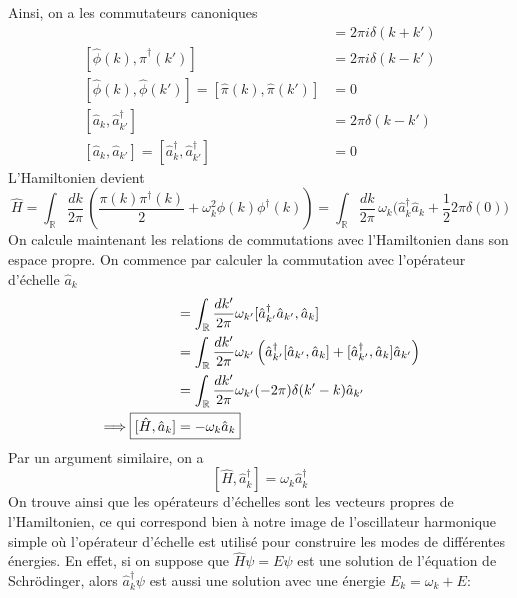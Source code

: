 \documentclass{article}
\numberwithin{equation}{section}
\theoremstyle{solution}
\begin{document}
Ainsi, on a les commutateurs canoniques
\begin{align}
        [\hat{\phi}(k), \hat{\pi}(k')] &= 2\pi i\delta(k + k') \\
        [\hat{\phi}(k), \hat{\pi}^{\dagger}(k')] &= 2\pi i\delta(k - k') \\
        [\hat{\phi}(k), \hat{\phi}(k')] = [\hat{\pi}(k), \hat{\pi}(k')]  &= 0 \\
        [\hat{a}_k, \hat{a}^{\dagger}_{k'}] &= 2\pi \delta(k - k') \\
        [\hat{a}_k, \hat{a}_{k'}] = [\hat{a}^{\dagger}_k,\hat{a}^{\dagger}_{k'}] &= 0
\end{align}
L'Hamiltonien devient
\begin{equation}
        \hat{H} = \int_{\mathbb{R}}\frac{dk}{2\pi}\, \left(  \frac{\pi(k)\pi^{\dagger}(k)}{2} + \omega_k^{2}\phi(k)\phi^{\dagger}(k)\right) = \int_{\mathbb{R}}\frac{dk}{2\pi}\, \omega_k\big(\hat{a}^{\dagger}_k \hat{a}_k + \frac{1}{2}2\pi\delta(0)\big)
\end{equation} 
On calcule maintenant les relations de commutations avec l'Hamiltonien dans son espace propre. 
On commence par calculer la commutation avec l'opérateur d'échelle $\hat{a}_k$
\begin{align*}
        [\hat{H}, \hat{a}_k] &= \int_{\mathbb{R}} \frac{dk'}{2\pi} \omega_{k'}[\hat{a}^{\dagger}_{k'} \hat{a}_{k'}, \hat{a}_{k}] \\
        &= \int_{\mathbb{R}} \frac{dk'}{2\pi} \omega_{k'}\left( \hat{a}^{\dagger}_{k'}[ \hat{a}_{k'}, \hat{a}_{k}] + [\hat{a}^{\dagger}_{k'} , \hat{a}_{k}] \hat{a}_{k'}\right)\\
        &= \int_{\mathbb{R}} \frac{dk'}{2\pi} \omega_{k'}(-2\pi) \delta(k' - k)\hat{a}_{k'}\\
        \implies  \Aboxed{ [\hat{H}, \hat{a}_k]  &= -\omega_k \hat{a}_{k}}
\end{align*}
Par un argument similaire, on a
\begin{equation}
        \boxed{[\hat{H}, \hat{a}^{\dagger}_k] = \omega_k\hat{a}^{\dagger}_k}
\end{equation} 
On trouve ainsi que les opérateurs d'échelles sont les vecteurs propres de l'Hamiltonien, ce qui correspond bien à notre image de 
l'oscillateur harmonique simple où l'opérateur d'échelle est utilisé pour construire les modes de différentes énergies. En effet, si on suppose que 
$\hat{H}\psi = E \psi$ est une solution de l'équation de Schrödinger, alors $\hat{a}^{\dagger}_k \psi$ est aussi une solution avec une énergie $E_k = \omega_k + E$:
\end{document}
